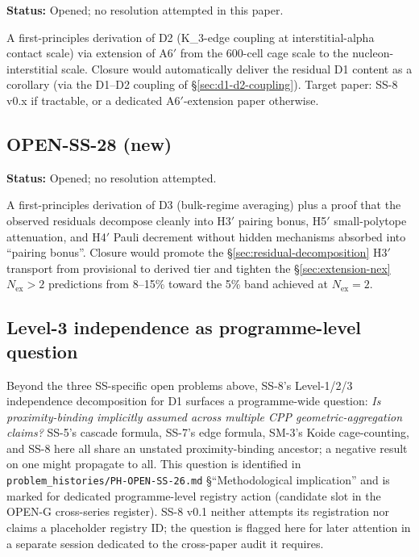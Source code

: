 \documentclass[11pt,letterpaper]{article}
\theoremstyle{definition}
\newcommand{\Nex}{N_{\text{ex}}}
\newcommand{\Kthree}{K_3}
\begin{document}
\textbf{Status:} Opened; no resolution attempted in this paper.

A first-principles derivation of D2 (\Kthree-edge coupling at interstitial-alpha contact scale) via extension of A6$'$ from the 600-cell cage scale to the nucleon-interstitial scale. Closure would automatically deliver the residual D1 content as a corollary (via the D1--D2 coupling of \S\ref{sec:d1-d2-coupling}). Target paper: SS-8 v0.x if tractable, or a dedicated A6$'$-extension paper otherwise.

\subsection{OPEN-SS-28 (new)}
\label{sec:open-ss-28}

\textbf{Status:} Opened; no resolution attempted.

A first-principles derivation of D3 (bulk-regime averaging) plus a proof that the observed residuals decompose cleanly into H3$'$ pairing bonus, H5$'$ small-polytope attenuation, and H4$'$ Pauli decrement without hidden mechanisms absorbed into ``pairing bonus''. Closure would promote the \S\ref{sec:residual-decomposition} H3$'$ transport from provisional to derived tier and tighten the \S\ref{sec:extension-nex} $\Nex > 2$ predictions from 8--15\% toward the 5\% band achieved at $\Nex = 2$.

\subsection{Level-3 independence as programme-level question}
\label{sec:level-3-frontier}

Beyond the three SS-specific open problems above, SS-8's Level-1/2/3 independence decomposition for D1 surfaces a programme-wide question: \emph{Is proximity-binding implicitly assumed across multiple CPP geometric-aggregation claims?} SS-5's cascade formula, SS-7's edge formula, SM-3's Koide cage-counting, and SS-8 here all share an unstated proximity-binding ancestor; a negative result on one might propagate to all. This question is identified in \texttt{problem\_histories/PH-OPEN-SS-26.md} \S``Methodological implication'' and is marked for dedicated programme-level registry action (candidate slot in the OPEN-G cross-series register). SS-8 v0.1 neither attempts its registration nor claims a placeholder registry ID; the question is flagged here for later attention in a separate session dedicated to the cross-paper audit it requires.
\end{document}
